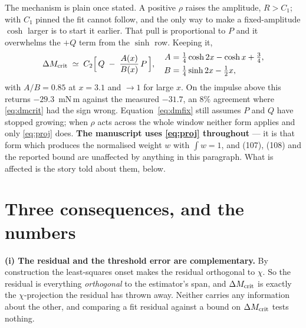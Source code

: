 \documentclass[11pt]{article}
\begin{document}
The mechanism is plain once stated. A positive $\rho$ raises the
amplitude, $R > C_1$; with $C_1$ pinned the fit cannot follow, and the
only way to make a fixed-amplitude $\cosh$ larger is to start it
earlier. That pull is proportional to $P$ and it overwhelms the $+Q$
term from the $\sinh$ row. Keeping it,
\begin{equation}
  \Delta M_{\rm crit} \;\simeq\; C_2\Bigl[\,Q
    \;-\; \frac{A(x)}{B(x)}\,P\,\Bigr],
  \quad
  \begin{aligned}
   A &= \tfrac14\cosh 2x - \cosh x + \tfrac34,\\
   B &= \tfrac14\sinh 2x - \tfrac12 x,
  \end{aligned}
  \label{eq:dmfix}
\end{equation}
with $A/B = 0.85$ at $x = 3.1$ and $\to1$ for large $x$. On the impulse
above this returns $-29.3$~mN\,m against the measured $-31.7$, an $8\%$
agreement where \eqref{eq:dmcrit} had the sign wrong.
Equation~\eqref{eq:dmfix} still assumes $P$ and $Q$ have stopped
growing; when $\rho$ acts across the whole window neither form applies
and only \eqref{eq:proj} does. \textbf{The manuscript uses
\eqref{eq:proj} throughout} --- it is that form which produces the
normalised weight $w$ with $\int w = 1$, and (107), (108) and the
reported bound are unaffected by anything in this paragraph. What is
affected is the story told about them, below.

\section{Three consequences, and the numbers}

\textbf{(i) The residual and the threshold error are complementary.}
By construction the least-squares onset makes the residual orthogonal to
$\chi$. So the residual is everything \emph{orthogonal} to the
estimator's span, and $\Delta M_{\rm crit}$ is exactly the
$\chi$-projection the residual has thrown away. Neither carries any
information about the other, and comparing a fit residual against a
bound on $\Delta M_{\rm crit}$ tests nothing.
\end{document}
